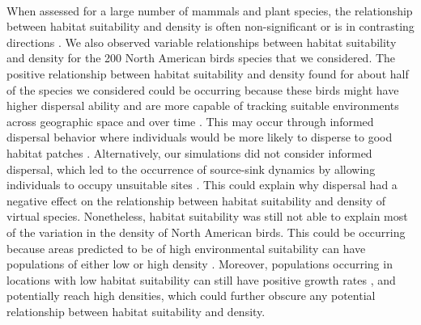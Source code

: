 \paragraph*{}
When assessed for a large number of mammals and plant species, the relationship between habitat suitability and density is often non-significant or is in contrasting directions \parencite{dallas2018,sporbert2020}. We also observed variable relationships between habitat suitability and density for the 200 North American birds species that we considered. The positive relationship between habitat suitability and density found for about half of the species we considered could be occurring because these birds might have higher dispersal ability and are more capable of tracking suitable environments across geographic space and over time \parencite{tingley2009, zurell2018}. This may occur through informed dispersal behavior where individuals would be more likely to disperse to good habitat patches \parencite{clobert2009, oro2021}. Alternatively, our simulations did not consider informed dispersal, which led to the occurrence of source-sink dynamics by allowing individuals to occupy unsuitable sites \parencite{pulliam1988, pulliam2000, furrer2016}. This could explain why dispersal had a negative effect on the relationship between habitat suitability and density of virtual species. Nonetheless, habitat suitability was still not able to explain most of the variation in the density of North American birds. This could be occurring because areas predicted to be of high environmental suitability can have populations of either low or high density \parencite{vanderwal2009, acevedo2017, braz2020}. Moreover, populations occurring in locations with low habitat suitability can still have positive growth rates \parencite{thuiller2014,cserg2017}, and potentially reach high densities, which could further obscure any potential relationship between habitat suitability and density. 


